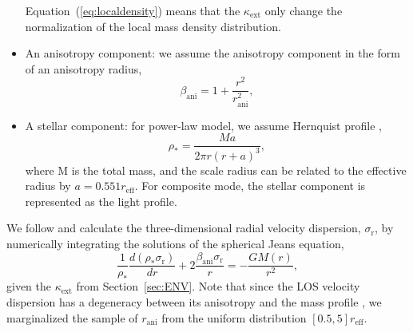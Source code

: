 \documentclass[useAMS,usenatbib]{mnras}
\newcommand{\sref}[1]{Section~\ref{#1}}
\newcommand{\eref}[1]{Equation~(\ref{#1})}
\begin{document}
\begin{itemize}
\begin{equation}
    \end{equation}
    \eref{eq:localdensity} means that the $\kappa_{\textrm{ext}}$ only change the normalization of the local mass density distribution.
    \item An anisotropy component:
    we assume the anisotropy component in the form of an anisotropy radius, 
    \begin{equation}
    \beta_{\textrm{ani}}=1+\frac{r^{2}}{r^{2}_{\textrm{ani}}},
    \end{equation}
    \item A stellar component: for power-law model, we assume Hernquist profile \citep{Hernquist90},
    \begin{equation}
    \rho_{\ast}=\frac{Ma}{2\pi r(r+a)^3},
    \end{equation}
    where M is the total mass, and the scale radius can be related to the effective radius by $a=0.551r_{\textrm{eff}}$. For composite mode, the stellar component is represented as the light profile.
\end{itemize}
We follow \citet{SonnenfeldEtal12} and calculate the three-dimensional radial velocity dispersion, $\sigma_{\textrm{r}}$, by numerically integrating the solutions of the spherical Jeans equation,
\begin{equation}
    \frac{1}{\rho_{\ast}}\frac{d(\rho_{\ast}\sigma_{\textrm{r}})}{dr}+2\frac{\beta_{\textrm{ani}}\sigma_{\textrm{r}}}{r}=-\frac{GM(r)}{r^{2}},
\end{equation}
given the $\kappa_{\textrm{ext}}$ from \sref{sec:ENV}.
Note that since the LOS velocity dispersion has a degeneracy between its anisotropy and the mass profile \citep{Dejonghe87}, we marginalized the sample of $r_{\textrm{ani}}$ from the uniform distribution $[0.5,5]r_{\textrm{eff}}$. 
\end{document}
